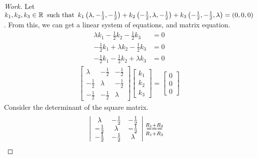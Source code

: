 \documentclass{article}
\begin{document}
\begin{proof}[Work]
    Let $k_1, k_2, k_3 \in \mathbb{R} \operatorname{~\text{such that}~} k_1\left(\lambda, -\frac{1}{2}, -\frac{1}{2}\right) + k_2\left(-\frac{1}{2}, \lambda, -\frac{1}{2}\right) + k_3\left(-\frac{1}{2}, -\frac{1}{2}, \lambda\right) = (0,0,0)$. From this, we can get a linear system of equations, and matrix equation.
    \begin{align*}
        \lambda k_1 - \frac{1}{2}k_2 - \frac{1}{2}k_3  & = 0 \\
        -\frac{1}{2}k_1 + \lambda k_2 -\frac{1}{2}k_3  & = 0 \\
        -\frac{1}{2}k_1 - \frac{1}{2}k_2 + \lambda k_3 & = 0
    \end{align*}
    \begin{align*}
        \begin{bmatrix}
            \lambda      & -\frac{1}{2} & -\frac{1}{2} \\
            -\frac{1}{2} & \lambda      & -\frac{1}{2} \\
            -\frac{1}{2} & -\frac{1}{2} & \lambda
        \end{bmatrix}
        \begin{bmatrix}
            k_1 \\ k_2 \\ k_3
        \end{bmatrix} =
        \begin{bmatrix}
            0 \\ 0 \\ 0
        \end{bmatrix}
    \end{align*}
    Consider the determinant of the square matrix.
    \begin{align*}
         & \left\lvert\begin{array}{ccc}
                          \lambda      & -\frac{1}{2} & -\frac{1}{2} \\
                          -\frac{1}{2} & \lambda      & -\frac{1}{2} \\
                          -\frac{1}{2} & -\frac{1}{2} & \lambda
                      \end{array}\right\rvert \overunderset{R_1 + R_2}{R_1 + R_3}{===}

\end{align*}
\end{proof}
\end{document}

